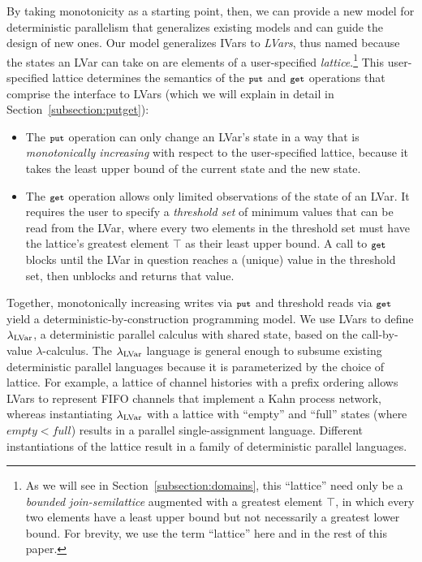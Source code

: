 By taking monotonicity as a starting point, then, we can provide a
new model for deterministic parallelism that
generalizes existing models and can guide the design of new ones.  Our
model generalizes IVars to \emph{LVars}, thus named because the states
an LVar can take on are elements of a user-specified
{\em lattice}.\footnote{
As we will see in Section~\ref{subsection:domains}, this ``lattice'' need only be a 
{\em bounded join-semilattice} augmented with a greatest element $\top$, in which every two elements have a least upper
bound but not necessarily a greatest lower bound.  For brevity, we use the term
  ``lattice'' here and in the
  rest of this paper.}
This user-specified lattice
determines the semantics of the $\mbox{\footnotesize \texttt{put}}$ and
$\mbox{\footnotesize \texttt{get}}$ operations that comprise the interface to LVars (which we 
will explain in detail in Section~\ref{subsection:putget}):
\begin{itemize}
\item The $\mbox{\footnotesize \texttt{put}}$ operation can only change an LVar's state in a way
  that is {\em monotonically increasing} with respect to the user-specified
  lattice, because it takes the least upper bound of the current
  state and the new state.

\item The $\mbox{\footnotesize \texttt{get}}$ operation allows only limited observations of the
  state of an LVar.  It requires the user to specify a {\em threshold
    set} of minimum values that can be read from the LVar, where every
  two elements in the threshold set must have the lattice's
  greatest element $\top$ as their least upper bound.  A call to
  $\mbox{\footnotesize \texttt{get}}$ blocks until the LVar in question reaches a (unique) value in the threshold set,
  then unblocks and returns that value.
\end{itemize}
Together, monotonically increasing writes via $\mbox{\footnotesize \texttt{put}}$ and threshold reads 
via $\mbox{\footnotesize \texttt{get}}$
yield a deterministic-by-construction programming model.
We use LVars to define $\textup{\ensuremath{\lambda_{\textrm{LVar}}}}$, a deterministic parallel calculus
with shared state, based on the call-by-value $\lambda$-calculus.  The
$\textup{\ensuremath{\lambda_{\textrm{LVar}}}}$ language is general enough to subsume existing
deterministic parallel languages because it is parameterized by the
choice of lattice.  For example, a lattice of channel histories with a
prefix ordering allows LVars to represent FIFO channels that implement
a Kahn process network, whereas instantiating $\textup{\ensuremath{\lambda_{\textrm{LVar}}}}$ with a
lattice with ``empty'' and ``full'' states (where $\mathit{empty} <
\mathit{full}$) results in a parallel single-assignment language.
Different instantiations of the lattice result in a family of
deterministic parallel languages.

